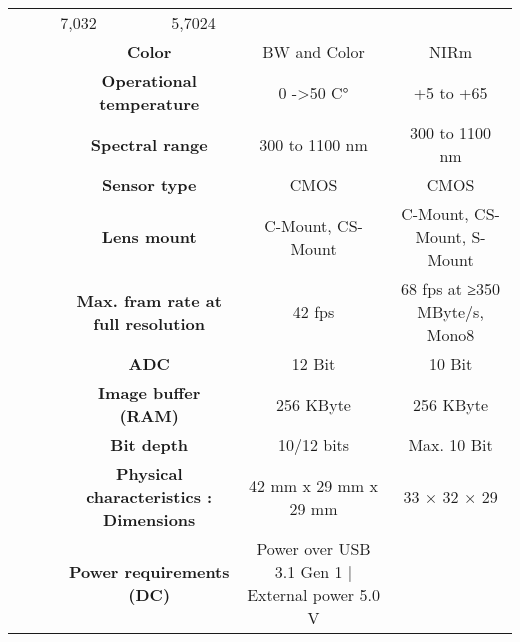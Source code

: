 \begin{table}[H]
{\begin{tabular}{ccc|cc|cc|}
  \multicolumn{2}{c|}{7,032} &
  \multicolumn{2}{c|}{5,7024} \\
\multicolumn{1}{|c|}{} &
  \multicolumn{2}{c|}{\cellcolor[HTML]{EFEFEF}\textbf{Color}} &
  \multicolumn{2}{c|}{\cellcolor[HTML]{EFEFEF}BW and Color} &
  \multicolumn{2}{c|}{\cellcolor[HTML]{EFEFEF}NIRm} \\
\multicolumn{1}{|c|}{} &
  \multicolumn{2}{c|}{\textbf{Operational temperature}} &
  \multicolumn{2}{c|}{0 -\textgreater 50 C°} &
  \multicolumn{2}{c|}{+5 to +65} \\
\multicolumn{1}{|c|}{} &
  \multicolumn{2}{c|}{\cellcolor[HTML]{EFEFEF}\textbf{Spectral range}} &
  \multicolumn{2}{c|}{\cellcolor[HTML]{EFEFEF}300 to 1100 nm} &
  \multicolumn{2}{c|}{\cellcolor[HTML]{EFEFEF}300 to 1100 nm} \\
\multicolumn{1}{|c|}{} &
  \multicolumn{2}{c|}{\textbf{Sensor type}} &
  \multicolumn{2}{c|}{CMOS} &
  \multicolumn{2}{c|}{CMOS} \\
\multicolumn{1}{|c|}{} &
  \multicolumn{2}{c|}{\cellcolor[HTML]{EFEFEF}\textbf{Lens mount}} &
  \multicolumn{2}{c|}{\cellcolor[HTML]{EFEFEF}C-Mount, CS-Mount} &
  \multicolumn{2}{c|}{\cellcolor[HTML]{EFEFEF}C-Mount, CS-Mount, S-Mount} \\
\multicolumn{1}{|c|}{} &
  \multicolumn{2}{c|}{\textbf{Max. fram rate at full resolution}} &
  \multicolumn{2}{c|}{42 fps} &
  \multicolumn{2}{c|}{68 fps at ≥350 MByte/s, Mono8} \\
\multicolumn{1}{|c|}{} &
  \multicolumn{2}{c|}{\cellcolor[HTML]{EFEFEF}\textbf{ADC}} &
  \multicolumn{2}{c|}{\cellcolor[HTML]{EFEFEF}12 Bit} &
  \multicolumn{2}{c|}{\cellcolor[HTML]{EFEFEF}10 Bit} \\
\multicolumn{1}{|c|}{} &
  \multicolumn{2}{c|}{\textbf{Image buffer (RAM)}} &
  \multicolumn{2}{c|}{256 KByte} &
  \multicolumn{2}{c|}{256 KByte} \\
\multicolumn{1}{|c|}{} &
  \multicolumn{2}{c|}{\cellcolor[HTML]{EFEFEF}\textbf{Bit depth}} &
  \multicolumn{2}{c|}{\cellcolor[HTML]{EFEFEF}10/12 bits} &
  \multicolumn{2}{c|}{\cellcolor[HTML]{EFEFEF}Max. 10 Bit} \\
\multicolumn{1}{|c|}{} &
  \multicolumn{2}{c|}{\textbf{Physical characteristics : Dimensions}} &
  \multicolumn{2}{c|}{42 mm x 29 mm x 29 mm} &
  \multicolumn{2}{c|}{33 × 32 × 29} \\
\multicolumn{1}{|c|}{} &
  \multicolumn{2}{c|}{\cellcolor[HTML]{EFEFEF}\textbf{Power requirements (DC)}} &
  \multicolumn{2}{c|}{\cellcolor[HTML]{EFEFEF}Power over USB 3.1 Gen 1 | External power 5.0 V} &

\end{tabular}}
\end{table}
